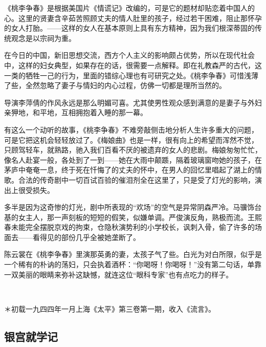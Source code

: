\par 《桃李争春》是根据美国片《情谎记》改编的，可是它的题材却贴恋着中国人的心。这里的贤妻含辛茹苦照顾丈夫的情人肚里的孩子，经过若干困难，阻止那怀孕的女人打胎。——这样的女人在基本原则上具有东方精神，因为我们根深蒂固的传统观念是以宗祠为重。
\par 在今日的中国，新旧思想交流，西方个人主义的影响颇占优势，所以在现代社会中，这样的妇女典型，如果存在的话，很需要一点解释。即在礼教森严的古代，这一类的牺牲一己的行为，里面的错综心理也有可研究之处。《桃李争春》可惜浅薄了些，全然忽略了妻子与情妇的内心过程，仿佛一切都是理所当然的。
\par 导演李萍倩的作风永远是那么明媚可喜。尤其使男性观众感到满意的是妻子与外妇亲狎地，和平地，互相拥抱着入睡的那一幕。
\par 有这么一个动听的故事，《桃李争春》不难旁敲侧击地分析人生许多重大的问题，可是它把这机会轻轻放过了。《梅娘曲》也是一样，很有向上的希望而浑然不觉，只顾驾轻车，就熟路，驰入我们百看不厌的被遗弃的女人的悲剧。梅娘匆匆忙忙，像名人赴宴一般，各处到了一到——她在大雨中颠踬，隔着玻璃窗吻她的孩子，在茅庐中奄奄一息，终于死在忏悔了的丈夫的怀中，在男人的回忆里唱起了湖上的情歌。合法的传奇剧中一切百试百验的催泪剂全在这里了，只是受了灯光的影响，演出上很受损失。
\par 多半是因为这奇惨的灯光，剧中所表现的“欢场”的空气是异常阴森严冷。马骥饰台基的女主人，那一声刻板的短短的假笑，似嫌单调。严俊演反角，熟极而流。王熙春未能完全摆脱京戏的拘束，仓隐秋演势利的小学校长，讽刺入骨，偷了许多的场面去——看得见的部份几乎全被她垄断了。
\par 陈云裳在《桃李争春》里演那英勇的妻，太孩子气了些。白光为对白所限，似乎是一个稀有的朴讷的荡妇，只会执着酒杯：“你喝呀！你喝呀！”没有第二句话，单靠一双美丽的眼睛来弥补这缺憾，就连这位“眼科专家”也有点吃力的样子。
\par  
\par ＊初载一九四四年一月上海《太平》第三卷第一期，收入《流言》。


\subsection{银宫就学记}

